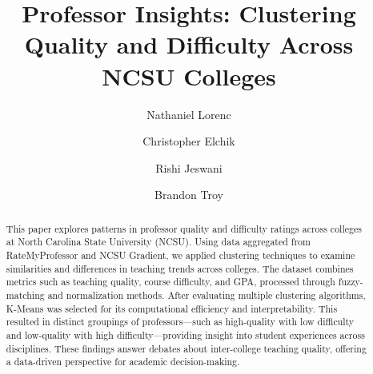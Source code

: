 \documentclass[sigconf,nonacm]{acmart}
\begin{document}
\title{Professor Insights: Clustering Quality and Difficulty Across NCSU Colleges}

\author{Nathaniel Lorenc}

\author{Christopher Elchik}

\author{Rishi Jeswani}

\author{Brandon Troy}

\renewcommand{\shortauthors}{Lorenc et al.}

\begin{abstract}
  This paper explores patterns in professor quality and difficulty ratings across colleges at North Carolina State University (NCSU). Using data aggregated from RateMyProfessor and NCSU Gradient, we applied clustering techniques to examine similarities and differences in teaching trends across colleges. The dataset combines metrics such as teaching quality, course difficulty, and GPA, processed through fuzzy-matching and normalization methods. After evaluating multiple clustering algorithms, K-Means was selected for its computational efficiency and interpretability. This resulted in distinct groupings of professors—such as high-quality with low difficulty and low-quality with high difficulty—providing insight into student experiences across disciplines. These findings answer debates about inter-college teaching quality, offering a data-driven perspective for academic decision-making.
\end{abstract}
\maketitle
\end{document}
